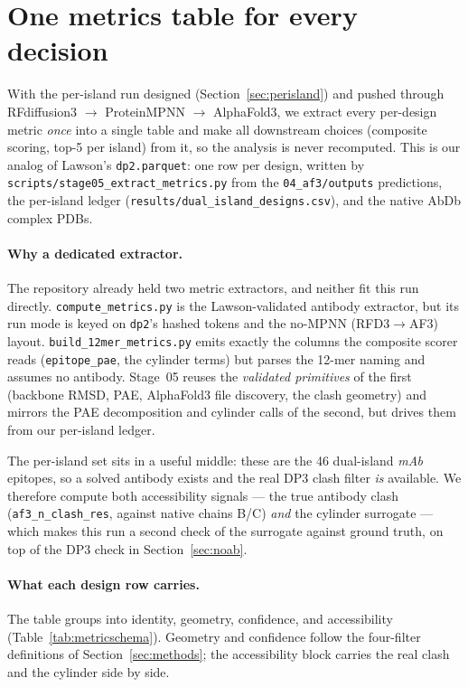 \section{One metrics table for every decision}\label{sec:metrics}
With the per-island run designed (Section~\ref{sec:perisland}) and pushed through
RFdiffusion3 $\rightarrow$ ProteinMPNN $\rightarrow$ AlphaFold3, we extract every
per-design metric \emph{once} into a single table and make all downstream choices
(composite scoring, top-5 per island) from it, so the analysis is never recomputed. This is
our analog of Lawson's \texttt{dp2.parquet}: one row per design, written by
\texttt{scripts/stage05\_extract\_metrics.py} from the \texttt{04\_af3/outputs} predictions,
the per-island ledger (\texttt{results/dual\_island\_designs.csv}), and the native AbDb
complex PDBs.

\paragraph{Why a dedicated extractor.}
The repository already held two metric extractors, and neither fit this run directly.
\texttt{compute\_metrics.py} is the Lawson-validated antibody extractor, but its run mode is
keyed on \texttt{dp2}'s hashed tokens and the no-MPNN (RFD3$\rightarrow$AF3) layout.
\texttt{build\_12mer\_metrics.py} emits exactly the columns the composite scorer reads
(\texttt{epitope\_pae}, the cylinder terms) but parses the 12-mer naming and assumes no
antibody. Stage~05 reuses the \emph{validated primitives} of the first (backbone RMSD,
PAE, AlphaFold3 file discovery, the clash geometry) and mirrors the PAE decomposition and
cylinder calls of the second, but drives them from our per-island ledger.

The per-island set sits in a useful middle: these are the 46 dual-island \emph{mAb} epitopes,
so a solved antibody exists and the real DP3 clash filter \emph{is} available. We therefore
compute both accessibility signals --- the true antibody clash
(\texttt{af3\_n\_clash\_res}, against native chains B/C) \emph{and} the cylinder surrogate ---
which makes this run a second check of the surrogate against ground truth, on top of the DP3
check in Section~\ref{sec:noab}.

\paragraph{What each design row carries.}
The table groups into identity, geometry, confidence, and accessibility
(Table~\ref{tab:metricschema}). Geometry and confidence follow the four-filter definitions of
Section~\ref{sec:methods}; the accessibility block carries the real clash and the cylinder
side by side.

